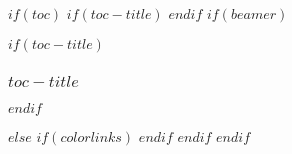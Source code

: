 $if(toc)$
$if(toc-title)$
\renewcommand*\contentsname{%
  {\roboto\bfseries\fontsize{18}{22}\selectfont $toc-title$} %
}
$endif$
$if(beamer)$
\begin{frame}[allowframebreaks]
$if(toc-title)$
  \frametitle{$toc-title$}
$endif$
  \tableofcontents[hideallsubsections]
\end{frame}
$else$
{
$if(colorlinks)$
\hypersetup{linkcolor=$if(toccolor)$$toccolor$$else$$endif$}
$endif$
\setcounter{tocdepth}{$toc-depth$}
\renewcommand{\contentsname}{%
  {\roboto\bfseries\fontsize{18}{22}\selectfont Innhold} %
}
\tableofcontents
\thispagestyle{ssb-report-footer-header} %
}
$endif$
$endif$

\newpage
